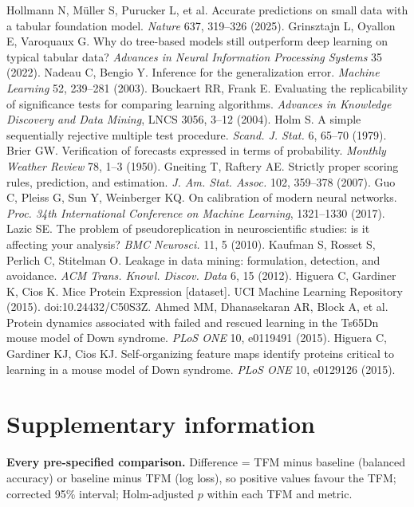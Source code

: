 \documentclass[10pt]{article}
\begin{document}
\begingroup
\small
\begin{thebibliography}{99}
\setlength{\itemsep}{0.15em}
 Hollmann N, M\"uller S, Purucker L, et al. Accurate predictions on small
data with a tabular foundation model. \emph{Nature} 637, 319--326 (2025).
 Grinsztajn L, Oyallon E, Varoquaux G. Why do tree-based models still
outperform deep learning on typical tabular data? \emph{Advances in Neural Information
Processing Systems} 35 (2022).
 Nadeau C, Bengio Y. Inference for the generalization error. \emph{Machine
Learning} 52, 239--281 (2003).
 Bouckaert RR, Frank E. Evaluating the replicability of significance
tests for comparing learning algorithms. \emph{Advances in Knowledge Discovery and Data Mining},
LNCS 3056, 3--12 (2004).
 Holm S. A simple sequentially rejective multiple test procedure.
\emph{Scand. J. Stat.} 6, 65--70 (1979).
 Brier GW. Verification of forecasts expressed in terms of probability.
\emph{Monthly Weather Review} 78, 1--3 (1950).
 Gneiting T, Raftery AE. Strictly proper scoring rules, prediction, and
estimation. \emph{J. Am. Stat. Assoc.} 102, 359--378 (2007).
 Guo C, Pleiss G, Sun Y, Weinberger KQ. On calibration of modern neural
networks. \emph{Proc. 34th International Conference on Machine Learning}, 1321--1330 (2017).
 Lazic SE. The problem of pseudoreplication in neuroscientific studies: is it
affecting your analysis? \emph{BMC Neurosci.} 11, 5 (2010).
 Kaufman S, Rosset S, Perlich C, Stitelman O. Leakage in data mining:
formulation, detection, and avoidance. \emph{ACM Trans. Knowl. Discov. Data} 6, 15 (2012).
 Higuera C, Gardiner K, Cios K. Mice Protein Expression [dataset]. UCI Machine
Learning Repository (2015). doi:10.24432/C50S3Z.
 Ahmed MM, Dhanasekaran AR, Block A, et al. Protein dynamics associated with
failed and rescued learning in the Ts65Dn mouse model of Down syndrome. \emph{PLoS ONE} 10,
e0119491 (2015).
 Higuera C, Gardiner KJ, Cios KJ. Self-organizing feature maps identify
proteins critical to learning in a mouse model of Down syndrome. \emph{PLoS ONE} 10, e0129126
(2015).
\end{thebibliography}
\endgroup

\clearpage
\section*{Supplementary information}
\begin{table}[H]
\centering
\caption{\textbf{Every pre-specified comparison.} Difference = TFM minus baseline (balanced
accuracy) or baseline minus TFM (log loss), so positive values favour the TFM; corrected 95\%
interval; Holm-adjusted $p$ within each TFM and metric.}
\label{tab:tests}
\footnotesize

\end{table}
\end{document}
